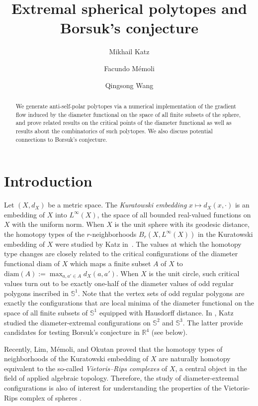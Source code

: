 \documentclass[12pt]{amsart}
\title{Extremal spherical polytopes and Borsuk's conjecture}
\date{}
\author{Mikhail  Katz}
\author{Facundo M\'emoli}
\author{Qingsong Wang}
\theoremstyle{plain}
\newcommand{\R}{\mathbb{R}}
\newcommand{\Sp}{\mathbb{S}}
\newcommand{\diam}{\mathrm{diam}}
\numberwithin{equation}{section}
\begin{document}
\maketitle



\begin{abstract}
We generate anti-self-polar polytopes via a numerical implementation of the gradient flow induced by the diameter functional on the space of all finite subsets of the sphere, and prove related results on the critical points of the diameter functional as well as results about the combinatorics of such polytopes. We also discuss potential connections to Borsuk's conjecture.

\end{abstract}


\tableofcontents

\section{Introduction}



Let $(X, d_X)$ be a metric space.  The \emph{Kuratowski embedding} $x
\mapsto d_X(x, \cdot)$ is an embedding of $X$ into $L^{\infty}(X)$,
the space of all bounded real-valued functions on $X$ with the uniform
norm.  When $X$ is the unit sphere with its geodesic distance, the
homotopy types of the $r$-neighborhoods $B_r(X, L^{\infty}(X))$ in the
Kuratowski embedding of $X$ were studied by Katz
in~\cite{katz1991neighborhoods}.  The values at which the homotopy
type changes are closely related to the critical configurations of the
diameter functional $\diam$ of $X$ which maps a finite subset $A$ of
$X$ to $\diam(A):=\max_{a,a'\in A}d_X(a,a')$.  When $X$ is the unit
circle, such critical values turn out to be exactly one-half of the
diameter values of odd regular polygons inscribed in $\Sp^1$.  Note
that the vertex sets of odd regular polygons are exactly the
configurations that are local minima of the diameter functional on the
{space of all finite subsets of $\Sp^1$ equipped with Hausdorff
  distance}.  In \cite{katz1989diameter}, Katz studied the
diameter-extremal configurations on $\Sp^2$ and $\Sp^3$.  The latter
provide candidates for testing Borsuk's conjecture in $\R^4$ (see
below).

Recently, Lim, M\'{e}moli, and Okutan
\cite[Theorem~5]{lim2020vietoris} proved that the homotopy types of
neighborhoods of the Kuratowski embedding of $X$ are naturally
homotopy equivalent to the so-called \emph{Vietoris--Rips complexes}
of $X$, a central object in the field of applied algebraic topology.
Therefore, the study of diameter-extremal configurations is also of
interest for understanding the properties of the Vietoris-Rips complex
of spheres \cite{adams-s1,adams-ot}.
\end{document}
